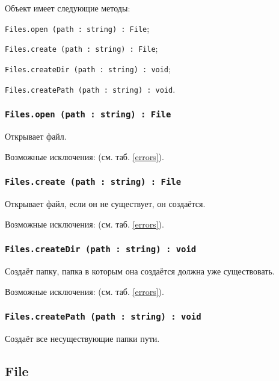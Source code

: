 Объект \files{} имеет следующие методы:
\begin{icItems}
	\item \texttt{Files.open (path : string) : File};
	\item \texttt{Files.create (path : string) : File};
	\item \texttt{Files.createDir (path : string) : void};
	\item \texttt{Files.createPath (path : string) : void}.
\end{icItems}

\subsubsection{\texttt{Files.open (path : string) : File}}

Открывает файл.

Возможные исключения:  (см. таб. \ref{errors}).

\subsubsection{\texttt{Files.create (path : string) : File}}

Открывает файл, если он не существует, он создаётся.

Возможные исключения:  (см. таб. \ref{errors}).

\subsubsection{\texttt{Files.createDir (path : string) : void}}

Создаёт папку, папка в которым она создаётся должна уже существовать.

Возможные исключения:  (см. таб. \ref{errors}).

\subsubsection{\texttt{Files.createPath (path : string) : void}}

Создаёт все несуществующие папки пути.

\subsection{{\color{orange} File}}

